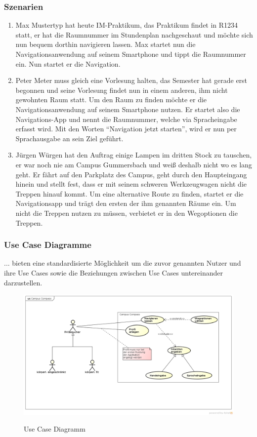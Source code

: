 \subsubsection*{Szenarien}
\begin{enumerate}
  \item Max Mustertyp hat heute IM-Praktikum, das Praktikum findet in R1234 statt, er hat die Raumnummer im Stundenplan nachgeschaut und möchte sich nun bequem dorthin navigieren lassen. Max startet nun die Navigationsanwendung auf seinem Smartphone und tippt die Raumnummer ein. Nun startet er die Navigation.
  \item Peter Meter muss gleich eine Vorlesung halten, das Semester hat gerade erst begonnen und seine Vorlesung findet nun in einem anderen, ihm nicht gewohnten Raum statt. Um den Raum zu finden möchte er die Navigationsanwendung auf seinem Smartphone nutzen. Er startet also die Navigations-App und nennt die Raumnummer, welche via Spracheingabe erfasst wird. Mit den Worten “Navigation jetzt starten”, wird er nun per Sprachausgabe an sein Ziel geführt.
  \item Jürgen Würgen hat den Auftrag einige Lampen im dritten Stock zu tauschen, er war noch nie am Campus Gummersbach und weiß deshalb nicht wo es lang geht. Er fährt auf den Parkplatz des Campus, geht durch den Haupteingang hinein und stellt fest, dass er mit seinem schweren Werkzeugwagen nicht die Treppen hinauf kommt. Um eine alternative Route zu finden, startet er die Navigationsapp und trägt den ersten der ihm genannten Räume ein. Um nicht die Treppen nutzen zu müssen, verbietet er in den Wegoptionen die Treppen.
\end{enumerate}

\subsubsection*{Use Case Diagramme}
... bieten eine standardisierte Möglichkeit um die zuvor genannten Nutzer und ihre Use Cases sowie die Beziehungen zwischen Use Cases untereinander darzustellen.

\begin{figure}[hbt]
  \includegraphics{img/use-case-diagram.png}
  \label{img:use-case-diagramm}
  \caption{Use Case Diagramm}
\end{figure}

